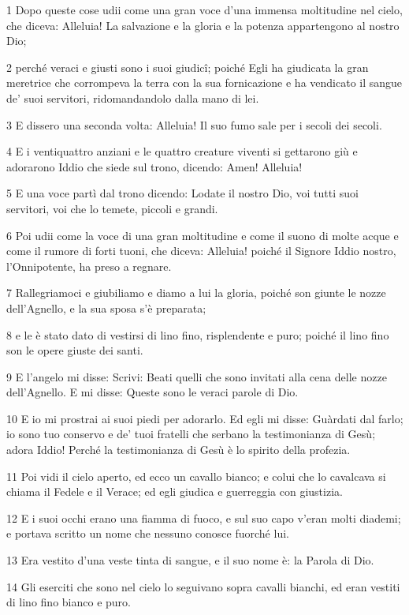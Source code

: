 \par 1 Dopo queste cose udii come una gran voce d'una immensa moltitudine nel cielo, che diceva: Alleluia! La salvazione e la gloria e la potenza appartengono al nostro Dio;
\par 2 perché veraci e giusti sono i suoi giudicî; poiché Egli ha giudicata la gran meretrice che corrompeva la terra con la sua fornicazione e ha vendicato il sangue de' suoi servitori, ridomandandolo dalla mano di lei.
\par 3 E dissero una seconda volta: Alleluia! Il suo fumo sale per i secoli dei secoli.
\par 4 E i ventiquattro anziani e le quattro creature viventi si gettarono giù e adorarono Iddio che siede sul trono, dicendo: Amen! Alleluia!
\par 5 E una voce partì dal trono dicendo: Lodate il nostro Dio, voi tutti suoi servitori, voi che lo temete, piccoli e grandi.
\par 6 Poi udii come la voce di una gran moltitudine e come il suono di molte acque e come il rumore di forti tuoni, che diceva: Alleluia! poiché il Signore Iddio nostro, l'Onnipotente, ha preso a regnare.
\par 7 Rallegriamoci e giubiliamo e diamo a lui la gloria, poiché son giunte le nozze dell'Agnello, e la sua sposa s'è preparata;
\par 8 e le è stato dato di vestirsi di lino fino, risplendente e puro; poiché il lino fino son le opere giuste dei santi.
\par 9 E l'angelo mi disse: Scrivi: Beati quelli che sono invitati alla cena delle nozze dell'Agnello. E mi disse: Queste sono le veraci parole di Dio.
\par 10 E io mi prostrai ai suoi piedi per adorarlo. Ed egli mi disse: Guàrdati dal farlo; io sono tuo conservo e de' tuoi fratelli che serbano la testimonianza di Gesù; adora Iddio! Perché la testimonianza di Gesù è lo spirito della profezia.
\par 11 Poi vidi il cielo aperto, ed ecco un cavallo bianco; e colui che lo cavalcava si chiama il Fedele e il Verace; ed egli giudica e guerreggia con giustizia.
\par 12 E i suoi occhi erano una fiamma di fuoco, e sul suo capo v'eran molti diademi; e portava scritto un nome che nessuno conosce fuorché lui.
\par 13 Era vestito d'una veste tinta di sangue, e il suo nome è: la Parola di Dio.
\par 14 Gli eserciti che sono nel cielo lo seguivano sopra cavalli bianchi, ed eran vestiti di lino fino bianco e puro.
